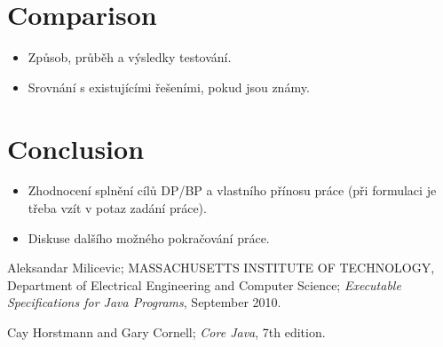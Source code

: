 \documentclass[11pt,twoside,a4paper]{book}
\begin{document}
\chapter{Comparison}

\begin{itemize}
 \item Způsob, průběh a výsledky testování.
 \item Srovnání s existujícími řešeními, pokud jsou známy.
\end{itemize} 


\chapter{Conclusion}

\begin{itemize}
\item Zhodnocení splnění cílů DP/BP a  vlastního přínosu práce (při formulaci je třeba vzít v potaz zadání práce).
\item Diskuse dalšího možného pokračování práce.
\end{itemize} 


\begin{thebibliography}{1}

Aleksandar Milicevic; MASSACHUSETTS INSTITUTE OF TECHNOLOGY, Department of
Electrical Engineering and Computer Science; \textit{Executable Specifications
for Java Programs}, September 2010.

Cay Horstmann and Gary Cornell; \textit{Core Java}, 7th edition.



\end{thebibliography}

%

\end{document}
